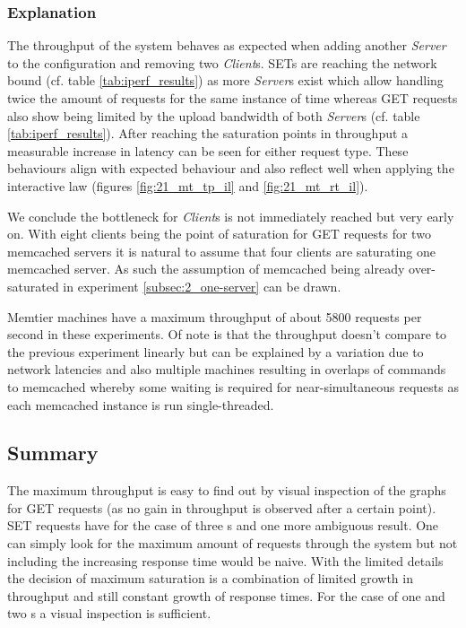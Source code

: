         \subsubsection{Explanation}

            The throughput of the system behaves as expected when adding another \emph{Server} to the configuration
            and removing two \emph{Client}s. SETs are reaching the network bound (cf. table \ref{tab:iperf_results})
            as more \emph{Server}s exist which allow handling twice the amount of requests for the same instance of
            time whereas GET requests also show being limited by the upload bandwidth of both \emph{Server}s (cf.
            table \ref{tab:iperf_results}). After reaching the saturation points in throughput a measurable increase
            in latency can be seen for either request type. These behaviours align with expected behaviour and also
            reflect well when applying the interactive law (figures \ref{fig:21_mt_tp_il} and
            \ref{fig:21_mt_rt_il}).

            We conclude the bottleneck for \emph{Client}s is not immediately reached but very early on. With eight
            clients being the point of saturation for GET requests for two memcached servers it is natural to assume
            that four clients are saturating one memcached server. As such the assumption of memcached being already
            over-saturated in experiment \ref{subsec:2_one-server} can be drawn.

            Memtier machines have a maximum throughput of about 5800 requests per second in these experiments. Of
            note is that the throughput doesn't compare to the previous experiment linearly but can be explained by
            a variation due to network latencies and also multiple machines resulting in overlaps of commands to
            memcached whereby some waiting is required for near-simultaneous requests as each memcached instance is run
            single-threaded.

    \subsection{Summary\label{subsec:23_summary}}

        The maximum throughput is easy to find out by visual inspection of the graphs for GET requests (as no gain
        in throughput is observed after a certain point). SET requests have for the case of three \cli{}s and one
        \srv{} more ambiguous result. One can simply look for the maximum amount of requests through the system but
        not including the increasing response time would be naive. With the limited details the decision of maximum
        saturation is a combination of limited growth in throughput and still constant growth of response times. For
        the case of one \cli{} and two \srv{}s a visual inspection is sufficient.


